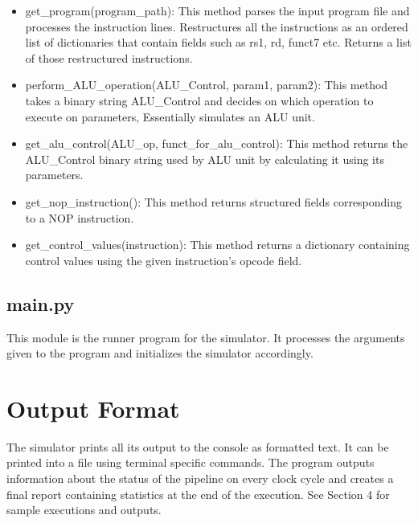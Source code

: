 \begin{itemize}
    \item get\_program(program\_path): This method parses the input program file and processes the instruction lines. Restructures all the instructions as an ordered list of dictionaries that contain fields such as rs1, rd, funct7 etc. Returns a list of those restructured instructions.
    \item perform\_ALU\_operation(ALU\_Control, param1, param2): This method takes a binary string ALU\_Control and decides on which operation to execute on parameters, Essentially simulates an ALU unit.    
    \item get\_alu\_control(ALU\_op, funct\_for\_alu\_control): This method returns the ALU\_Control binary string used by ALU unit by calculating it using its parameters.
    \item get\_nop\_instruction(): This method returns structured fields corresponding to a NOP instruction.
    \item get\_control\_values(instruction): This method returns a dictionary containing control values using the given instruction's opcode field.
    
    
\end{itemize}
\subsection{main.py}
This module is the runner program for the simulator. It processes the arguments given to the program and initializes the simulator accordingly.
\section{Output Format}
The simulator prints all its output to the console as formatted text. It can be printed into a file using terminal specific commands. The program outputs information about the status of the pipeline on every clock cycle and creates a final report containing statistics at the end of the execution. See Section 4 for sample executions and outputs.